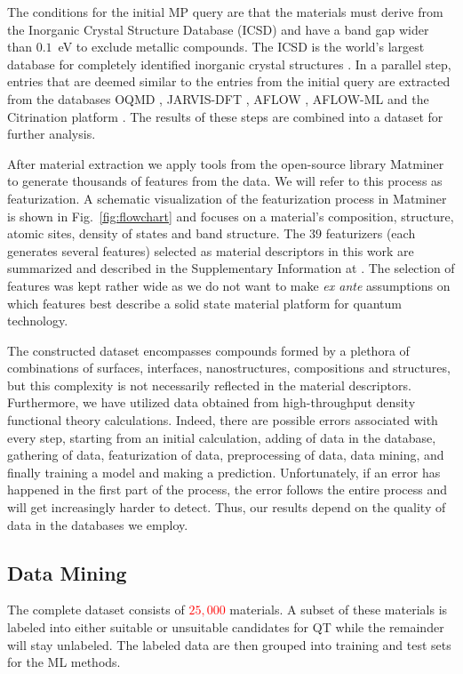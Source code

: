 \documentclass[superscriptaddress,unsortedaddress,
 amsmath,amssymb,
 aps,
]{revtex4-2}
\newcommand{\mrk}[1]{\textcolor{red}{#1}}
\begin{document}
The conditions for the initial MP query are that the materials must derive from the Inorganic Crystal Structure Database (ICSD) and have a band gap wider than $0.1$~eV to exclude metallic compounds. The ICSD is the world's largest database for completely identified inorganic crystal structures \cite{Allen1987,Zagorac2019}. In a parallel step, entries that are deemed similar to the entries from the initial query are extracted from the databases OQMD  \cite{Saal2013,Kirklin2015}, JARVIS-DFT \cite{Choudhary2020}, AFLOW \cite{Curtarolo2012, Curtarolo2012a, Calderon2015}, AFLOW-ML \cite{Isayev2017} and the Citrination platform \cite{OMaraJordan2016MDIA}. The results of these steps are combined into a dataset for further analysis. 

After material extraction we apply tools from the open-source library Matminer \cite{Ward2018} to generate thousands of features from the data. We will refer to this process as featurization. A schematic visualization of the featurization process in Matminer is shown in  Fig.~\ref{fig:flowchart} 
and focuses on a material's composition,  structure, atomic sites, density of states and band structure. 
The $39$ featurizers (each generates several features) selected as material descriptors in this work are summarized and described in the Supplementary Information at \cite{supplementary}. The selection of features was kept rather wide as we do not want to make {\em ex ante} assumptions on which features best describe a solid state material platform for quantum technology. 

The constructed dataset encompasses compounds formed by a plethora of combinations of surfaces, interfaces, nanostructures, compositions and structures, but this complexity is not necessarily reflected in the material descriptors. 
Furthermore, we have utilized data obtained from high-throughput density functional theory calculations. Indeed, there are possible errors associated with every step, starting from an initial calculation, adding of data in the database, gathering of data, featurization of data, preprocessing of data, data mining, and finally training a model and making a prediction. Unfortunately, if an error has happened in the first part of the process, the error follows the entire process and will get increasingly harder to detect. Thus, our results depend on the quality of data in the databases we employ. 

\subsection*{Data Mining}
The complete dataset consists of \mrk{$25,000$} materials. A subset of these materials is labeled into either suitable or unsuitable candidates for QT while the remainder will stay unlabeled. The labeled data are then grouped into training and test sets for the ML methods. 
\end{document}
